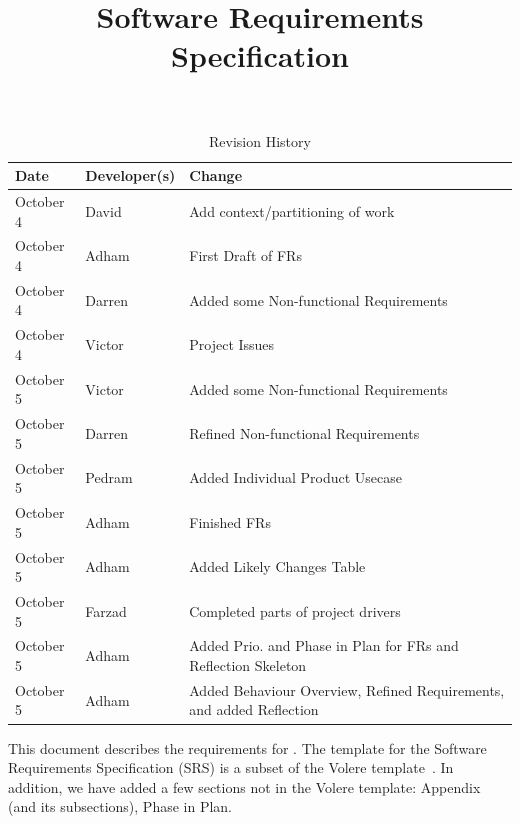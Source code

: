 \documentclass[12pt]{article}
\title{Software Requirements Specification\\\progname}
\author{\authname}
\date{}
\begin{document}
\maketitle

\newpage
{}

\tableofcontents

\newpage

\begin{table}[hp]
\caption{Revision History} \label{TblRevisionHistory}
\begin{tabularx}{\textwidth}{llX}
\toprule
\textbf{Date} & \textbf{Developer(s)} & \textbf{Change}\\
\midrule
October 4 & David & Add context/partitioning of work\\
\midrule
October 4 & Adham & First Draft of FRs\\
\midrule
October 4 & Darren & Added some Non-functional Requirements\\
\midrule
October 4 & Victor & Project Issues\\
\midrule
October 5 & Victor & Added some Non-functional Requirements\\
\midrule
October 5 & Darren & Refined Non-functional Requirements\\
\midrule
October 5 & Pedram & Added Individual Product Usecase\\
\midrule
October 5 & Adham & Finished FRs\\
\midrule
October 5 & Adham & Added Likely Changes Table\\
\midrule
October 5 & Farzad & Completed parts of project drivers\\
\midrule
October 5 & Adham & Added Prio. and Phase in Plan for FRs and Reflection Skeleton\\
\midrule
October 5 & Adham & Added Behaviour Overview, Refined Requirements, and added Reflection\\
\bottomrule
\end{tabularx}
\end{table}

\newpage

\listoftables
\listoffigures

\newpage


This document describes the requirements for \progname. The template for the Software
Requirements Specification (SRS) is a subset of the Volere
template~\cite{RobertsonAndRobertson2012}. In addition, we have added a few sections not
in the Volere template: Appendix (and its subsections), Phase in Plan.
\end{document}
